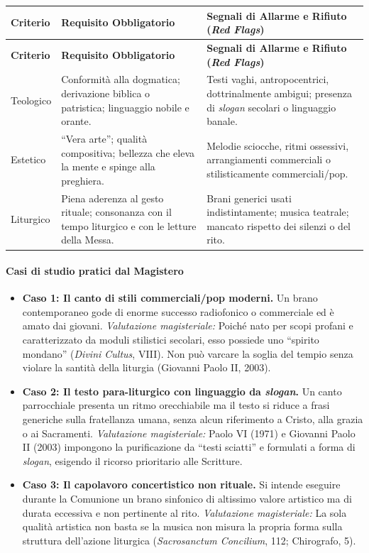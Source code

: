 \documentclass[12pt,a4paper]{article}
\begin{document}
	\begin{longtable}{L{2.5cm}L{5cm}L{6cm}}
		\toprule
		\textbf{Criterio} & \textbf{Requisito Obbligatorio} & \textbf{Segnali di Allarme e Rifiuto (\emph{Red Flags})} \\
		\midrule
		\endfirsthead
		\toprule
		\textbf{Criterio} & \textbf{Requisito Obbligatorio} & \textbf{Segnali di Allarme e Rifiuto (\emph{Red Flags})} \\
		\midrule
		\endhead
		\bottomrule
		\endlastfoot
		Teologico & Conformità alla dogmatica; derivazione biblica o patristica; linguaggio nobile e orante. & Testi vaghi, antropocentrici, dottrinalmente ambigui; presenza di \emph{slogan} secolari o linguaggio banale. \\
		Estetico & ``Vera arte''; qualità compositiva; bellezza che eleva la mente e spinge alla preghiera. & Melodie sciocche, ritmi ossessivi, arrangiamenti commerciali o stilisticamente commerciali/pop. \\
		Liturgico & Piena aderenza al gesto rituale; consonanza con il tempo liturgico e con le letture della Messa. & Brani generici usati indistintamente; musica teatrale; mancato rispetto dei silenzi o del rito. \\
	\end{longtable}
	
	\paragraph{Casi di studio pratici dal Magistero}\label{casi-di-studio-pratici-dal-magistero}
	
	\begin{itemize}[leftmargin=*]
		\item \textbf{Caso 1: Il canto di stili commerciali/pop moderni.} Un brano contemporaneo gode di enorme successo radiofonico o commerciale ed è amato dai giovani. \emph{Valutazione magisteriale:} Poiché nato per scopi profani e caratterizzato da moduli stilistici secolari, esso possiede uno ``spirito mondano'' (\emph{Divini Cultus}, VIII). Non può varcare la soglia del tempio senza violare la santità della liturgia (Giovanni Paolo II, 2003).
		\item \textbf{Caso 2: Il testo para-liturgico con linguaggio da \emph{slogan}.} Un canto parrocchiale presenta un ritmo orecchiabile ma il testo si riduce a frasi generiche sulla fratellanza umana, senza alcun riferimento a Cristo, alla grazia o ai Sacramenti. \emph{Valutazione magisteriale:} Paolo VI (1971) e Giovanni Paolo II (2003) impongono la purificazione da ``testi sciatti'' e formulati a forma di \emph{slogan}, esigendo il ricorso prioritario alle Scritture.
		\item \textbf{Caso 3: Il capolavoro concertistico non rituale.} Si intende eseguire durante la Comunione un brano sinfonico di altissimo valore artistico ma di durata eccessiva e non pertinente al rito. \emph{Valutazione magisteriale:} La sola qualità artistica non basta se la musica non misura la propria forma sulla struttura dell'azione liturgica (\emph{Sacrosanctum Concilium}, 112; Chirografo, 5).
	\end{itemize}
	
\end{document}
